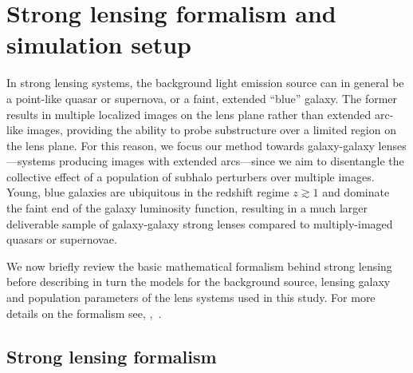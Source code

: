 \documentclass[twocolumn]{aastex62}
\begin{document}
\section{Strong lensing formalism and simulation setup}
\label{sec:lensing-formalism}

In strong lensing systems, the background light emission source can in general be a point-like quasar or supernova, or a faint, extended ``blue'' galaxy. The former results in multiple localized images on the lens plane rather than extended arc-like images, providing the ability to probe substructure over a limited region on the lens plane. For this reason, we focus our method towards galaxy-galaxy lenses---systems producing images with extended arcs---since we aim to disentangle the collective effect of a population of subhalo perturbers over multiple images. Young, blue galaxies are ubiquitous in the redshift regime $z\gtrsim1$ and dominate the faint end of the galaxy luminosity function, resulting in a much larger deliverable sample of galaxy-galaxy strong lenses compared to multiply-imaged quasars or supernovae.

We now briefly review the basic mathematical formalism behind strong lensing before describing in turn the models for the background source, lensing galaxy and population parameters of the lens systems used in this study. For more details on the formalism see, \eg,~\cite{2001astro.ph..2341K,1992grle.book.....S,1003.5567}.

\subsection{Strong lensing formalism}
\end{document}
